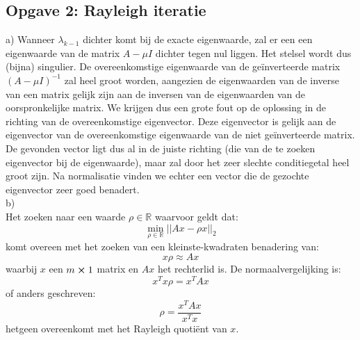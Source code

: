 \documentclass[a4paper]{article}
\newcommand{\opgave}[1]{\subsection{Opgave #1}}
\begin{document}
\opgave{2: Rayleigh iteratie}\label{sec:oef2}
a) Wanneer $\lambda_{k-1}$ dichter komt bij de exacte eigenwaarde, zal er een een eigenwaarde van de matrix $A-\mu I$ dichter tegen nul liggen. Het stelsel wordt dus (bijna) singulier.  De overeenkomstige eigenwaarde van de ge\"inverteerde matrix $(A-\mu I)^{-1}$ zal heel groot worden, aangezien de eigenwaarden van de inverse van een matrix gelijk zijn aan de inversen van de eigenwaarden van de oorspronkelijke matrix.  We krijgen dus een grote fout op de oplossing in de richting van de overeenkomstige eigenvector. Deze eigenvector is gelijk aan de eigenvector van de overeenkomstige eigenwaarde van de niet ge\"inverteerde matrix.  De gevonden vector ligt dus al in de juiste richting (die van de te zoeken eigenvector bij de eigenwaarde), maar zal door het zeer slechte conditiegetal heel groot zijn. Na normalisatie vinden we echter een vector die de gezochte eigenvector zeer goed benadert.\\
\newline
b) \\  Het zoeken naar een waarde $\rho \in \mathbb{R}$ waarvoor geldt dat:
\begin{equation}
\min_{\rho \in \mathbb{R}} ||Ax - \rho x||_2
\end{equation}
komt overeen met het zoeken van een kleinste-kwadraten benadering van:
\begin{equation}
x \rho \approx Ax
\end{equation}
waarbij $x$ een $m \cross 1$ matrix en $Ax$ het rechterlid is.
De normaalvergelijking is:
\begin{equation}
x^T x \rho = x^T A x
\end{equation}
of anders geschreven:
\begin{equation}
\rho = \frac{x^T A x}{x^T x}
\end{equation}
hetgeen overeenkomt met het Rayleigh quoti\"ent van $x$.
\end{document}
